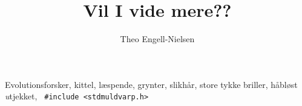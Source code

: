 \documentclass[danish]{article}
\title{Vil I vide mere??}
\author{Theo Engell-Nielsen}
\begin{document}
 \maketitle
\vspace{-0.3cm}

\begin{roles}
     {\small Evolutionsforsker, kittel, læspende, grynter,
    slikhår, store tykke briller, håbløst {\em u}tjekket, {\tt
      \#include <stdmuldvarp.h>}}
\end{roles}

\begin{props}
\end{props}

\begin{sketch}


\end{sketch}
\end{document}
